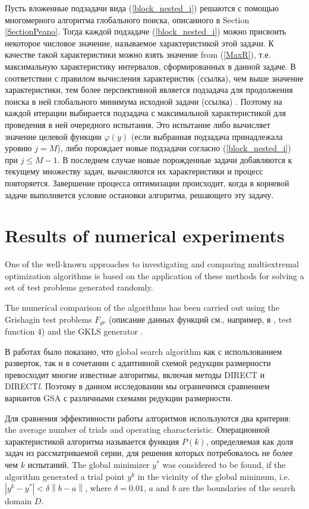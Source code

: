 \documentclass[runningheads]{llncs}
\begin{document}
Пусть вложенные подзадачи вида (\ref{block_nested_i}) решаются с помощью многомерного алгоритма глобального поиска, описанного в Section \ref{SectionPeano}. Тогда каждой подзадаче (\ref{block_nested_i}) можно присвоить некоторое числовое
значение, называемое характеристикой этой задачи. К качестве такой характеристики можно взять значение from (\ref{MaxR}), т.е. максимальную характеристику интервалов, сформированных в данной задаче. В соответствии с правилом вычисления характеристик (ссылка), чем выше значение характеристики, тем более перспективной является подзадача для продолжения поиска в ней глобального минимума исходной задачи (ссылка)  . Поэтому на каждой итерации выбирается подзадача с максимальной характеристикой для проведения в ней очередного испытания. Это испытание либо вычисляет значение целевой функции $\varphi(y)$ (если выбранная подзадача принадлежала уровню $j=M$), либо порождает новые подзадачи согласно (\ref{block_nested_i}) при $j\leq M-1$. В последнем случае новые порожденные задачи добавляются к текущему множеству задач, вычисляются их характеристики и процесс повторяется. Завершение процесса оптимизации происходит, когда в корневой задаче выполняется условие остановки алгоритма, решающего эту задачу.

\section{Results of numerical experiments}

One of the well-known approaches to investigating and comparing multiextremal optimization algorithms is based on the application of these methods for solving a set of test problems generated randomly.

The numerical comparison of the algorithms has been carried out using the Grishagin test problems $F_{gr}$ (описание данных функций см., например, в \cite{Grishagin1994}, test function 4) and the GKLS generator \cite{Gaviano2003}.

В работах \cite{Barkalov2015,Grishagin2018} было показано, что global search algorithm как с использованием разверток, так и в сочетании с адаптивной схемой редукции размерности превосходит многие известные алгоритмы, включая методы DIRECT и DIRECT\textit{l}. Поэтому в данном исследовании мы ограничимся сравнением вариантов GSA с различными схемами редукции размерности.

Для сравнения эффективности работы алгоритмов используются два критерия: the average number of trials and operating characteristic.
Операционной характеристикой алгоритма называется функция $P(k)$, определяемая как доля задач из рассматриваемой серии, для решения которых потребовалось не более чем $k$ испытаний.
The global minimizer $y^\ast$ was considered to be found, if the algorithm generated a trial point $y^k$ in the vicinity of the global minimum, i.e. $\left|y^k-y^\ast\right| < \delta \left\|b-a\right\|$, where $\delta = 0.01$, $a$ and $b$ are the boundaries of the search domain $D$.
\end{document}

